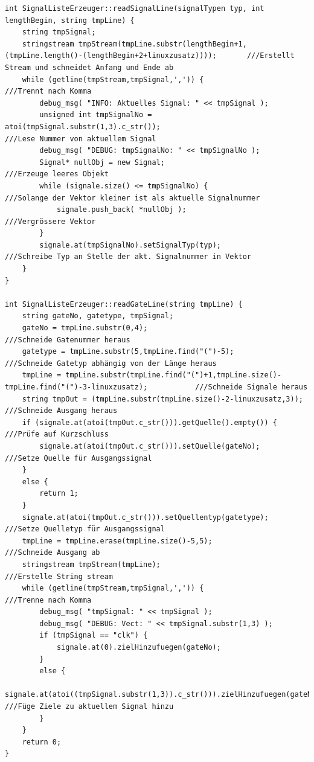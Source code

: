 \documentclass[a4paper,10pt,twoside]{report}
\begin{document}
\begin{lstlisting}
int SignalListeErzeuger::readSignalLine(signalTypen typ, int lengthBegin, string tmpLine) {
    string tmpSignal;
    stringstream tmpStream(tmpLine.substr(lengthBegin+1,(tmpLine.length()-(lengthBegin+2+linuxzusatz))));       ///Erstellt Stream und schneidet Anfang und Ende ab
    while (getline(tmpStream,tmpSignal,',')) {                                                      ///Trennt nach Komma
        debug_msg( "INFO: Aktuelles Signal: " << tmpSignal );
        unsigned int tmpSignalNo = atoi(tmpSignal.substr(1,3).c_str());                                       ///Lese Nummer von aktuellem Signal
        debug_msg( "DEBUG: tmpSignalNo: " << tmpSignalNo );
        Signal* nullObj = new Signal;                                                                  ///Erzeuge leeres Objekt
        while (signale.size() <= tmpSignalNo) {                                              ///Solange der Vektor kleiner ist als aktuelle Signalnummer
            signale.push_back( *nullObj );                                                             ///Vergrössere Vektor
        }
        signale.at(tmpSignalNo).setSignalTyp(typ);                                          ///Schreibe Typ an Stelle der akt. Signalnummer in Vektor
    }
}

int SignalListeErzeuger::readGateLine(string tmpLine) {
    string gateNo, gatetype, tmpSignal;
    gateNo = tmpLine.substr(0,4);                                       ///Schneide Gatenummer heraus
    gatetype = tmpLine.substr(5,tmpLine.find("(")-5);                   ///Schneide Gatetyp abhängig von der Länge heraus
    tmpLine = tmpLine.substr(tmpLine.find("(")+1,tmpLine.size()-tmpLine.find("(")-3-linuxzusatz);           ///Schneide Signale heraus
    string tmpOut = (tmpLine.substr(tmpLine.size()-2-linuxzusatz,3));                                       ///Schneide Ausgang heraus
    if (signale.at(atoi(tmpOut.c_str())).getQuelle().empty()) {                                     ///Prüfe auf Kurzschluss
        signale.at(atoi(tmpOut.c_str())).setQuelle(gateNo);                                         ///Setze Quelle für Ausgangssignal
    }
    else {
        return 1;
    }
    signale.at(atoi(tmpOut.c_str())).setQuellentyp(gatetype);                                         ///Setze Quelletyp für Ausgangssignal
    tmpLine = tmpLine.erase(tmpLine.size()-5,5);                                                      ///Schneide Ausgang ab
    stringstream tmpStream(tmpLine);                                                            ///Erstelle String stream
    while (getline(tmpStream,tmpSignal,',')) {                                                  ///Trenne nach Komma
        debug_msg( "tmpSignal: " << tmpSignal );
        debug_msg( "DEBUG: Vect: " << tmpSignal.substr(1,3) );
        if (tmpSignal == "clk") {
            signale.at(0).zielHinzufuegen(gateNo);
        }
        else {
            signale.at(atoi((tmpSignal.substr(1,3)).c_str())).zielHinzufuegen(gateNo);               ///Füge Ziele zu aktuellem Signal hinzu
        }
    }
    return 0;
}


\end{lstlisting}
\end{document}
